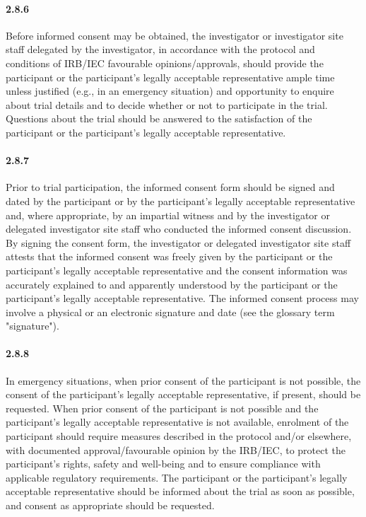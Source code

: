 \documentclass[11pt]{article}
\begin{document}
\paragraph{2.8.6} Before informed consent may be obtained, the investigator or investigator site staff delegated by the investigator, in accordance with the protocol and conditions of IRB/IEC favourable opinions/approvals, should provide the participant or the participant's legally acceptable representative ample time unless justified (e.g., in an emergency situation) and opportunity to enquire about trial details and to decide whether or not to participate in the trial. Questions about the trial should be answered to the satisfaction of the participant or the participant's legally acceptable representative.

\paragraph{2.8.7} Prior to trial participation, the informed consent form should be signed and dated by the participant or by the participant's legally acceptable representative and, where appropriate, by an impartial witness and by the investigator or delegated investigator site staff who conducted the informed consent discussion. By signing the consent form, the investigator or delegated investigator site staff attests that the informed consent was freely given by the participant or the participant's legally acceptable representative and the consent information was accurately explained to and apparently understood by the participant or the participant's legally acceptable representative. The informed consent process may involve a physical or an electronic signature and date (see the glossary term "signature").

\paragraph{2.8.8} In emergency situations, when prior consent of the participant is not possible, the consent of the participant's legally acceptable representative, if present, should be requested. When prior consent of the participant is not possible and the participant's legally acceptable representative is not available, enrolment of the participant should require measures described in the protocol and/or elsewhere, with documented approval/favourable opinion by the IRB/IEC, to protect the participant's rights, safety and well-being and to ensure compliance with applicable regulatory requirements. The participant or the participant's legally acceptable representative should be informed about the trial as soon as possible, and consent as appropriate should be requested.
\end{document}

